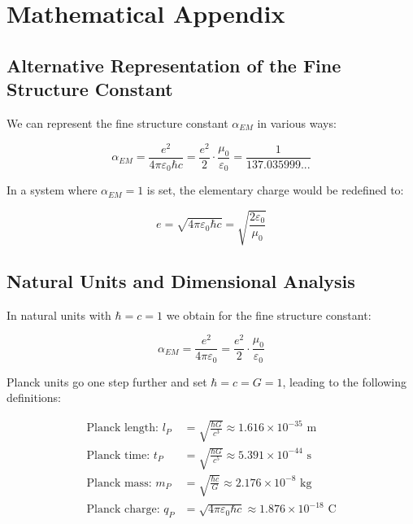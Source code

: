 \documentclass[12pt,a4paper]{article}
\begin{document}
	\section{Mathematical Appendix}
	
	\subsection{Alternative Representation of the Fine Structure Constant}
	
	We can represent the fine structure constant $\alpha_{EM}$ in various ways:
	
	\begin{equation}
		\alpha_{EM} = \frac{e^2}{4\pi\varepsilon_0\hbar c} = \frac{e^2}{2} \cdot \frac{\mu_0}{\varepsilon_0} = \frac{1}{137.035999...}
	\end{equation}
	
	In a system where $\alpha_{EM} = 1$ is set, the elementary charge would be redefined to:
	
	\begin{equation}
		e = \sqrt{4\pi\varepsilon_0\hbar c} = \sqrt{\frac{2\varepsilon_0}{\mu_0}}
	\end{equation}
	
	\subsection{Natural Units and Dimensional Analysis}
	
	In natural units with $\hbar = c = 1$ we obtain for the fine structure constant:
	
	\begin{equation}
		\alpha_{EM} = \frac{e^2}{4\pi\varepsilon_0} = \frac{e^2}{2} \cdot \frac{\mu_0}{\varepsilon_0}
	\end{equation}
	
	Planck units go one step further and set $\hbar = c = G = 1$, leading to the following definitions:
	
	\begin{align}
		\text{Planck length: } l_P &= \sqrt{\frac{\hbar G}{c^3}} \approx 1.616 \times 10^{-35} \text{ m}\\
		\text{Planck time: } t_P &= \sqrt{\frac{\hbar G}{c^5}} \approx 5.391 \times 10^{-44} \text{ s}\\
		\text{Planck mass: } m_P &= \sqrt{\frac{\hbar c}{G}} \approx 2.176 \times 10^{-8} \text{ kg}\\
		\text{Planck charge: } q_P &= \sqrt{4\pi\varepsilon_0\hbar c} \approx 1.876 \times 10^{-18} \text{ C}
	\end{align}
	
\end{document}
